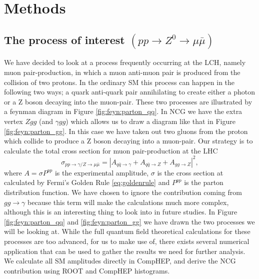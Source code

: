 \section{Methods}

\subsection{The process of interest $(pp \rightarrow Z^0 \rightarrow \mu \bar\mu)$}
We have decided to look at a process frequently occurring at the LCH, namely muon pair-production, in which a muon anti-muon pair is produced from the collision of two protons. In the ordinary SM this process can happen in the following two ways; a quark anti-quark pair annihilating to create either a photon or a Z boson decaying into the muon-pair. These two processes are illustrated by a feynman diagram in Figure \ref{fig:feyn:parton_qq}. In NCG we have the extra vertex $Zgg$ (and $\gamma gg$) which allows us to draw a diagram like that in Figure \ref{fig:feyn:parton_gg}. In this case we have taken out two gluons from the proton which collide to produce a Z boson decaying into a muon-pair. Our strategy is to calculate the total cross section for muon pair-production at the LHC
\begin{equation}
	\sigma_{pp \rightarrow \gamma/ Z \rightarrow \mu \bar \mu} = |A_{q \bar q \rightarrow \gamma} + A_{q \bar q \rightarrow Z} + A_{gg \rightarrow Z}|^{2},
\end{equation}
where $A = \sigma P^{pp}$ is the experimental amplitude, $\sigma$ is the cross section at calculated by Fermi's Golden Rule \eqref{eq:goldenrule} and $P^{pp}$ is the parton distribution function. We have chosen to ignore the contribution coming from $gg \rightarrow \gamma$ because this term will make the calculations much more complex, although this is an interesting thing to look into in future studies. In Figure \ref{fig:feyn:parton_qq} and \ref{fig:feyn:parton_gg} we have drawn the two processes we will be looking at. While the full quantum field theoretical calculations for these processes are too advanced, for us to make use of, there exists several numerical application that can be used to gather the results we need for further analysis. We calculate all SM amplitudes directly in CompHEP, and derive the NCG contribution using ROOT and CompHEP histograms.

